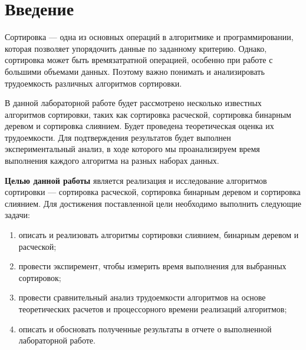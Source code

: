 \chapter*{Введение}

Сортировка --- одна из основных операций в алгоритмике и программировании, которая позволяет упорядочить данные по заданному критерию. Однако, сортировка может быть времязатратной операцией, особенно при работе с большими объемами данных. Поэтому важно понимать и анализировать трудоемкость различных алгоритмов сортировки.

В данной лабораторной работе будет рассмотрено несколько известных алгоритмов сортировки, таких как сортировка расческой, сортировка бинарным деревом и сортировка слиянием. Будет проведена теоретическая оценка их трудоемкости. Для подтверждения результатов будет выполнен экспериментальный анализ, в ходе которого мы проанализируем время выполнения каждого алгоритма на разных наборах данных.


\textbf{Целью данной работы} является реализация и исследование алгоритмов сортировки --- сортировка расческой, сортировка бинарным деревом и сортировка слиянием.
Для достижения поставленной цели необходимо выполнить следующие задачи:
\begin{enumerate}[label=\arabic*)]
	\item описать и реализовать алгоритмы сортировки слиянием, бинарным деревом и расческой;
    \item провести экспиремент, чтобы измерить время выполнения для выбранных сортировок;
    \item провести сравнительный анализ трудоемкости алгоритмов на основе теоретических расчетов и процессорного времени реализаций алгоритмов;
	\item описать и обосновать полученные результаты в отчете о выполненной лабораторной работе.
\end{enumerate}